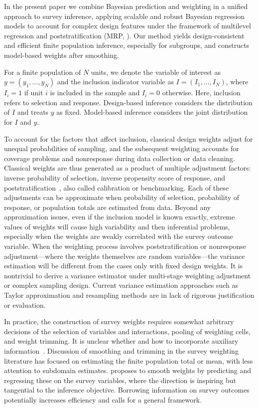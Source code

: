 \documentclass[11pt]{article}
\numberwithin{figure}{section}
\numberwithin{table}{section}
\numberwithin{equation}{section}
\begin{document}
In the present paper we combine Bayesian prediction and weighting in a unified
approach to survey inference, applying scalable and robust Bayesian regression
models to account for complex design features under the framework of multilevel
regression and poststratification (MRP,
\cite{gelman:little:97,park:gelman:bafumi-04,Ghitza:gelman-13}). Our method
yields design-consistent and efficient finite population inference, especially
for subgroups, and constructs model-based weights after smoothing.

For a finite population of $N$ units, we denote the variable of interest as
$y=(y_1,\dots,y_N)$ and the inclusion indicator variable as
$I=(I_1,\dots,I_N)$, where $I_i=1$ if unit $i$ is included in the sample and
$I_i=0$ otherwise. Here, inclusion refers to selection and response.
Design-based inference considers the distribution of $I$ and treats $y$ as
fixed. Model-based inference considers the joint distribution for $I$ and $y$.

To account for the factors that affect inclusion, classical design weights
adjust for unequal probabilities of sampling, and the subsequent weighting
accounts for coverage problems and nonresponse during data collection or data
cleaning. Classical weights are thus generated as a product of multiple
adjustment factors: inverse probability of selection, inverse propensity score
of response, and poststratification~\citep{hs79}, also called calibration or
benchmarking.  Each of these adjustments can be approximate when probability of
selection, probability of response, or population totals are estimated from
data.  Beyond any approximation issues, even if the inclusion model is known
exactly, extreme values of weights will cause high variability and then
inferential problems, especially when the weights are weakly correlated with
the survey outcome variable. When the weighting process involves
poststratification or nonresponse adjustment---where the weights themselves are
random variables---the variance estimation will be different from the cases
only with fixed design weights. It is nontrivial to derive a variance estimator
under multi-stage weighting adjustment or complex sampling design. Current
variance estimation approaches such as Taylor approximation and resampling
methods are in lack of rigorous justification or evaluation.

In practice, the construction of survey weights requires somewhat arbitrary
decisions of the selection of variables and interactions, pooling of weighting
cells, and weight trimming. It is unclear whether and how to incorporate
auxiliary information~\citep{groves:couper:98JOS}.  Discussion of smoothing and
trimming in the survey weighting literature
\cite[e.g.][]{potter88,trim-potter90,modeltrim-elliottandlittle00,elliott07,elliot:JOS16}
has focused on estimating the finite population total or mean, with less
attention to subdomain estimates. \cite{beaumont08} proposes to smooth weights
by predicting and regressing these on the survey variables, where the direction
is inspiring but tangential to the inference objective. Borrowing information
on survey outcomes potentially increases efficiency and calls for a general
framework.
\end{document}
